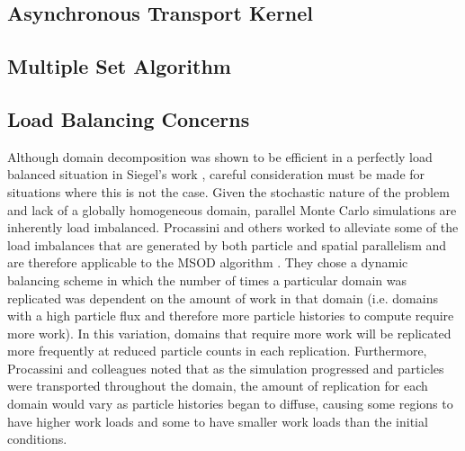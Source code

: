 \subsection{Asynchronous Transport Kernel}
\label{subsec:async_transport_kernel}

\subsection{Multiple Set Algorithm}
\label{subsec:multiple_sets_algorithm}

\subsection{Load Balancing Concerns}
\label{sec:mc_load_balancing}
Although domain decomposition was shown to be efficient in a perfectly
load balanced situation in Siegel's work \citep{siegel_analysis_2012},
careful consideration must be made for situations where this is not
the case. Given the stochastic nature of the problem and lack of a
globally homogeneous domain, parallel Monte Carlo simulations are
inherently load imbalanced. Procassini and others worked to alleviate
some of the load imbalances that are generated by both particle and
spatial parallelism and are therefore applicable to the MSOD algorithm
\citep{procassini_dynamic_2005}. They chose a dynamic balancing scheme
in which the number of times a particular domain was replicated was
dependent on the amount of work in that domain (i.e. domains with a
high particle flux and therefore more particle histories to compute
require more work). In this variation, domains that require more work
will be replicated more frequently at reduced particle counts in each
replication. Furthermore, Procassini and colleagues noted that as the
simulation progressed and particles were transported throughout the
domain, the amount of replication for each domain would vary as
particle histories began to diffuse, causing some regions to have
higher work loads and some to have smaller work loads than the initial
conditions.

